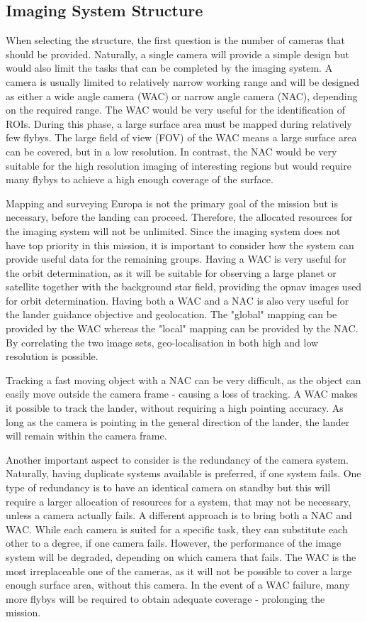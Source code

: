\subsection{Imaging System Structure}
When selecting the structure, the first question is the number of cameras that should be provided. Naturally, a single camera will provide a simple design but would also limit the tasks that can be completed by the imaging system. A camera is usually limited to relatively narrow working range and will be designed as either a wide angle camera (WAC) or narrow angle camera (NAC), depending on the required range. The WAC would be very useful for the identification of ROIs. During this phase, a large surface area must be mapped during relatively few flybys. The large field of view (FOV) of the WAC means a large surface area can be covered, but in a low resolution. In contrast, the NAC would be very suitable for the high resolution imaging of interesting regions but would require many flybys to achieve a high enough coverage of the surface.

Mapping and surveying Europa is not the primary goal of the mission but is necessary, before the landing can proceed. Therefore, the allocated resources for the imaging system will not be unlimited. Since the imaging system does not have top priority in this mission, it is important to consider how the system can provide useful data for the remaining groups. Having a WAC is very useful for the orbit determination, as it will be suitable for observing a large planet or satellite together with the background star field, providing the opnav images used for orbit determination. Having both a WAC and a NAC is also very useful for the lander guidance objective and geolocation. The "global" mapping can be provided by the WAC whereas the "local" mapping can be provided by the NAC. By correlating the two image sets, geo-localisation in both high and low resolution is possible.

Tracking a fast moving object with a NAC can be very difficult, as the object can easily move outside the camera frame - causing a loss of tracking. A WAC makes it possible to track the lander, without requiring a high pointing accuracy. As long as the camera is pointing in the general direction of the lander, the lander will remain within the camera frame.

Another important aspect to consider is the redundancy of the camera system. Naturally, having duplicate systems available is preferred, if one system fails. One type of redundancy is to have an identical camera on standby but this will require a larger allocation of resources for a system, that may not be necessary, unless a camera actually fails. A different approach is to bring both a NAC and WAC. While each camera is suited for a specific task, they can substitute each other to a degree, if one camera fails. However, the performance of the image system will be degraded, depending on which camera that fails. The WAC is the most irreplaceable one of the cameras, as it will not be possible to cover a large enough surface area, without this camera. In the event of a WAC failure, many more flybys will be required to obtain adequate coverage - prolonging the mission.

